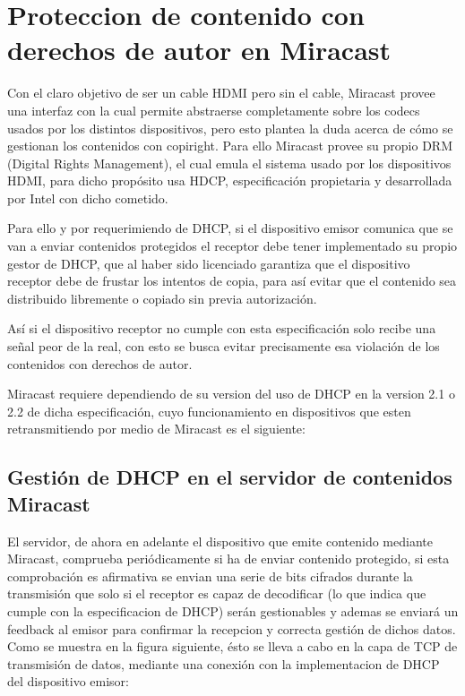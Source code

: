 \section{Proteccion de contenido con derechos de autor en Miracast}

Con el claro objetivo de ser un cable HDMI pero sin el cable, Miracast provee una interfaz con la cual permite abstraerse completamente sobre los codecs usados por los distintos dispositivos, pero esto plantea la duda acerca de cómo se gestionan los contenidos con copiright. Para ello Miracast provee su propio DRM (Digital Rights Management), el cual emula el sistema usado por los dispositivos HDMI, para dicho propósito usa HDCP, especificación propietaria y desarrollada por Intel con dicho cometido.

Para ello y por requerimiendo de DHCP, si el dispositivo emisor comunica que se van a enviar contenidos protegidos el receptor debe tener implementado su propio gestor de DHCP, que al haber sido licenciado garantiza que el dispositivo receptor debe de frustar los intentos de copia, para así evitar que el contenido sea distribuido libremente o copiado sin previa autorización.

Así si el dispositivo receptor no cumple con esta especificación solo recibe una señal peor de la real, con esto se busca evitar precisamente esa violación de los contenidos con derechos de autor.

Miracast requiere dependiendo de su version del uso de DHCP en la version 2.1 o 2.2 de dicha especificación, cuyo funcionamiento en dispositivos que esten retransmitiendo por medio de Miracast es el siguiente:

\subsection{Gestión de DHCP en el servidor de contenidos Miracast}

El servidor, de ahora en adelante el dispositivo que emite contenido mediante Miracast, comprueba periódicamente si ha de enviar contenido protegido, si esta comprobación es afirmativa se envian una serie de bits cifrados durante la transmisión que solo si el receptor es capaz de decodificar (lo que indica que cumple con la especificacion de DHCP) serán gestionables y ademas se enviará un feedback al emisor para confirmar la recepcion y correcta gestión de dichos datos. Como se muestra en la figura siguiente, ésto se lleva a cabo en la capa de TCP de transmisión de datos, mediante una conexión con la implementacion de DHCP del dispositivo emisor:

